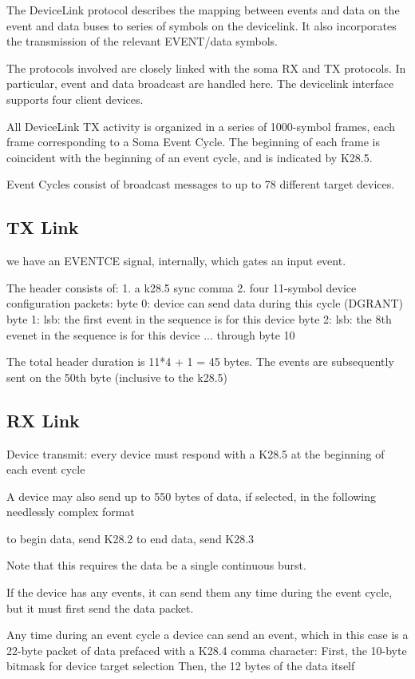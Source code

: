 
The DeviceLink protocol describes the mapping between events and
data on the event and data buses to series of symbols on the
devicelink. It also incorporates the transmission of the relevant
EVENT/data symbols.

The protocols involved are closely linked with the soma RX and TX
protocols. In particular, event and data broadcast are handled
here. The devicelink interface supports four client devices.

All DeviceLink TX activity is organized in a series of 1000-symbol
frames, each frame corresponding to a Soma Event Cycle. The beginning
of each frame is coincident with the beginning of an event cycle, and
is indicated by K28.5.

Event Cycles consist of broadcast messages to up to 78 different
target devices. 


\subsection{TX Link} 

we have an EVENTCE signal, internally, which gates an input event. 

The header consists of:
1. a k28.5 sync comma
2. four 11-symbol device configuration packets:
byte 0: device can send data during this cycle (DGRANT)
byte 1: lsb: the first event in the sequence is for this device
byte 2: lsb: the 8th evenet in the sequence is for this device
... through byte 10

The total header duration is 11*4 + 1 = 45 bytes. The events are
subsequently sent on the 50th byte (inclusive to the k28.5)

\subsection{RX Link}

Device transmit:
every device must respond with a K28.5 at the beginning of each event cycle

A device may also send up to 550 bytes of data, if selected, in the following needlessly complex format

to begin data, send K28.2
to end data, send K28.3

Note that this requires the data be a single continuous burst. 


If the device has any events, it can send them any time during the event cycle, but it must first send the data packet. 


Any time during an event cycle a device can send an event, which in
this case is a 22-byte packet of data prefaced with a K28.4 comma
character:
  First, the 10-byte bitmask for device target selection
  Then, the 12 bytes of the data itself



